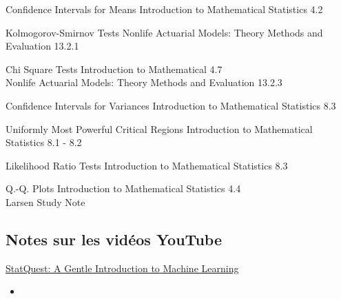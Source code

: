 \begin{CHPT_SUMM_AUTO_NUMB}[label = {L.-35}]{Confidence Intervals for Means}
Introduction to Mathematical Statistics 4.2

\tcbline


\end{CHPT_SUMM_AUTO_NUMB}

\begin{CHPT_SUMM_AUTO_NUMB}[label = {L.-36}]{Kolmogorov-Smirnov Tests}
Nonlife Actuarial Models: Theory Methods and Evaluation 13.2.1

\tcbline


\end{CHPT_SUMM_AUTO_NUMB}

\begin{CHPT_SUMM_AUTO_NUMB}[label = {L.-37}]{Chi Square Tests}
Introduction to Mathematical 4.7	\\
Nonlife Actuarial Models: Theory Methods and Evaluation 13.2.3

\tcbline


\end{CHPT_SUMM_AUTO_NUMB}

\begin{CHPT_SUMM_AUTO_NUMB}[label = {L.-38}]{Confidence Intervals for Variances}
Introduction to Mathematical Statistics 8.3

\tcbline


\end{CHPT_SUMM_AUTO_NUMB}

\begin{CHPT_SUMM_AUTO_NUMB}[label = {L.-39}]{Uniformly Most Powerful Critical Regions}
Introduction to Mathematical Statistics 8.1 - 8.2

\tcbline


\end{CHPT_SUMM_AUTO_NUMB}

\begin{CHPT_SUMM_AUTO_NUMB}[label = {L.-40}]{Likelihood Ratio Tests}
Introduction to Mathematical Statistics 8.3

\tcbline


\end{CHPT_SUMM_AUTO_NUMB}

\begin{CHPT_SUMM_AUTO_NUMB}[label = {L.-41}]{Q.-Q. Plots}
Introduction to Mathematical Statistics 4.4	\\
Larsen Study Note

\tcbline


\end{CHPT_SUMM_AUTO_NUMB}

\subsection{Notes sur les vidéos YouTube}

\begin{YTB_SUMM}[label = {SQ-BASICS-ML-INTRO}]{\href{https://www.youtube.com/watch?v=Gv9_4yMHFhI&list=PLblh5JKOoLUICTaGLRoHQDuF_7q2GfuJF&index=2&t=0s}{StatQuest: A Gentle Introduction to Machine Learning}}
\begin{itemize}
	\item	
\end{itemize}
\end{YTB_SUMM}
